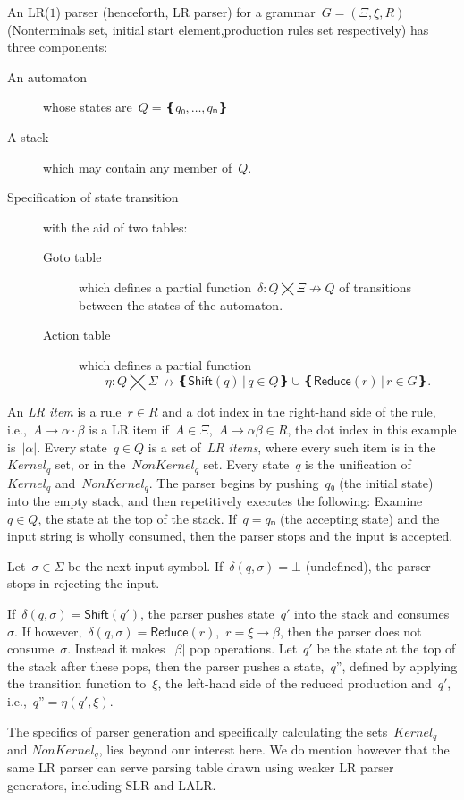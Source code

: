 An LR($1$) parser (henceforth, LR parser) for a grammar~$G=(Ξ,ξ,R)$ (Nonterminals set, initial start element,production rules set respectively)
  has three components:
\begin{description}
  \item[An automaton] whose states are~$Q=❴q₀,…,qₙ❵$
  \item[A stack] which may contain any member of~$Q$.
  \item[Specification of state transition] with the aid of two tables:
  \begin{description}
    \item[Goto table] which defines a partial function~$δ:Q⨉Ξ↛Q$ of transitions
    between the states of the automaton.
    \item[Action table] which
    defines a partial function\[η:Q⨉Σ↛ ❴ \textsf{Shift}(q) \,|\, q∈Q❵ ∪ ❴\textsf{Reduce}(r) \,| \, r∈G❵.\]
  \end{description}
\end{description}
An \emph{LR item} is a rule~$r∈R$ and a dot index in the right-hand side of the rule,
  i.e.,~$A→α·β$ is a LR item if~$A∈Ξ$,~$A→αβ∈R$,
  the dot index in this example is~$|α|$.
Every state~$q∈Q$ is a set of~\emph{LR items},
  where every such item is in the~$Kernel_{q}$ set,
  or in the~$NonKernel_{q}$ set.
Every state~$q$ is the unification of~$Kernel_{q}$ and~$NonKernel_{q}$.
The parser begins by pushing~$q₀$ (the initial state) into the empty stack,
and then repetitively executes the following:
Examine~$q∈Q$, the state at the top of the stack.
If~$q=qₙ$ (the accepting state) and the input string is wholly consumed, then the parser stops and the input is accepted.

Let~$σ∈Σ$ be the next input symbol.
If~$δ(q,σ)=⊥$ (undefined), the parser stops in rejecting the input.

If~$δ(q,σ) = \textsf{Shift}(q')$, the parser pushes state~$q'$
into the stack and consumes~$σ$.
If however,~$δ(q,σ) = \textsf{Reduce}(r)$,~$r=ξ→β$,
then the parser does not consume~$σ$.
Instead it makes~$|β|$ pop operations.
Let~$q'$ be the state at the top of the stack after these pops, then
the parser pushes a state,~$q”$,
defined by applying the transition function to~$ξ$, the left-hand side of the reduced production and~$q'$,
i.e.,~$q”=η(q',ξ)$.

The specifics of parser generation and specifically
  calculating the sets~$Kernel_{q}$ and $NonKernel_{q}$, lies beyond our interest here.
We do mention however that the same LR parser can serve parsing table drawn using weaker LR parser generators,
including SLR and LALR\@.

